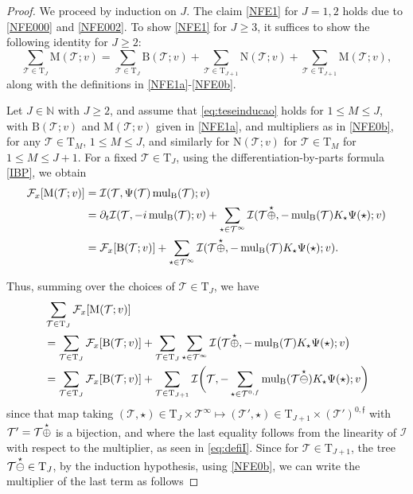 \documentclass[a4paper,
11pt,  reqno]{amsart}
\makeatletter
\newcommand{\5}{\textup{V}}
\newcommand{\noi}{\noindent}
\newcommand{\dt}{\partial_t}
\theoremstyle{remark}
\newcommand{\TT}{\mathcal{T}}
\newcommand{\Tr}{\mathrm{T}}
\newcommand{\Ft}{{\mathcal{F}}}
\newcommand{\ff}{\mathfrak{f}}
\newcommand{\N}{\mathbb{N}}
\DeclareMathOperator{\mulB}{mul_{\BB}}
\def\<#1>{\csname MH@symb@#1\endcsname}
\newcommand{\Ical}{\mathcal{I}}
\numberwithin{equation}{section}
\numberwithin{theorem}{section}
\newcommand{\MM}{\mathrm{M}}
\newcommand{\NN}{\mathrm{N}}
\newcommand{\BB}{\mathrm{B}}
\makeatother
\begin{document}
\begin{proof}



We proceed by induction on $J$.
The claim \eqref{NFE1} for $J=1,2$ holds due to \eqref{NFE000} and \eqref{NFE002}.
To show \eqref{NFE1} for $J\ge3$, it suffices to show the following identity for $J\ge 2$:
\begin{equation}\label{eq:teseinducao}
\sum_{\TT\in\Tr_{J}} \MM(\TT; v)
=
\sum_{\TT\in \Tr_{J}} \BB(\TT; v)
+
\sum_{\TT\in \Tr_{J+1}} \NN(\TT; v)
+ \sum_{\TT\in \Tr_{J+1}} \MM(\TT; v),
\end{equation}
along with the definitions in \eqref{NFE1a}-\eqref{NFE0b}.


Let $J\in \N$ with $J\ge2$, and assume that \eqref{eq:teseinducao} holds for $1\le M \le J$,
with $\BB(\TT; v)$ and $\MM(\TT; v)$ given in \eqref{NFE1a}, and multipliers as in \eqref{NFE0b}, for any $\TT\in \Tr_M$, $1\le M \le J$, and similarly for $\NN(\TT; v)$ for $\TT\in \Tr_M$ for $1\le M \le J+1$.
For a fixed $\TT\in\Tr_{J}$, using the differentiation-by-parts formula \eqref{IBP}, we obtain
\begin{align*}
\Ft_x [\MM(\TT; v) ]
&
=\Ical(\TT, \Psi(\TT)\mulB(\TT); v)
\\
& =
\dt\Ical(\TT, -i \mulB(\TT); v) +
\sum_{\star\in\TT^\infty}
\Ical (\TT \overset{\star}{\oplus} \<1>, -\mulB(\TT) K_\star \Psi(\star) ; v )
\\
&
= \Ft_x[\BB(\TT; v) ]
+
\sum_{\star\in\TT^\infty} \Ical (\TT \overset{\star}{\oplus} \<1>, -\mulB(\TT) K_\star \Psi(\star) ; v).
\end{align*}



\noi
Thus, summing over the choices of $\TT \in \Tr_{J}$, we have
\begin{align}
\label{mul2a}
\begin{split}
&
\sum_{\TT\in \Tr_{J}} \Ft_x [\MM(\TT; v) ]
\\
&
= \sum_{\TT\in \Tr_{J}} \Ft_x[\BB(\TT; v) ]
+
\sum_{\TT\in \Tr_{J}}
\sum_{\star\in\TT^\infty}
\Ical
\big(\TT \overset{\star}{\oplus} \<1>,
-\mulB(\TT) K_\star \Psi(\star);  v \big)
\\
&
=
 \sum_{\TT\in \Tr_{J}} \Ft_x[\BB(\TT; v) ]
+
\sum_{\TT\in \Tr_{J+1}}
\Ical
\bigg(\TT,
-\sum_{\star\in\TT^{0,f}}
\mulB(\TT \overset{\star}{\ominus}  \<1> ) K_\star \Psi(\star) ;
v
\bigg)
\end{split}
\end{align}
since that map taking $(\TT, \star) \in \Tr_J \times \TT^\infty \mapsto (\TT', \star) \in \Tr_{J+1} \times (\TT')^{0,\ff}$ with $\TT' = \TT \overset{\star}{\oplus} \<1>$ is a bijection, and
where the last equality follows from the linearity of $\Ical$ with respect to the multiplier, as seen in \eqref{eq:defiI}. Since for $\TT\in \Tr_{J+1}$, the tree $\TT \overset{\star}{\ominus} \<1>\in \Tr_{J}$, by the induction hypothesis, using \eqref{NFE0b}, we can write the multiplier of the last term as follows


\end{proof}
\end{document}
